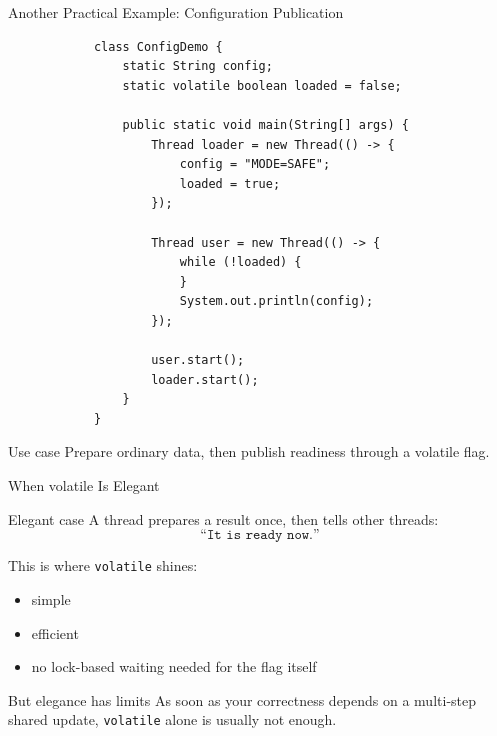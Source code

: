 \documentclass[aspectratio=169,11pt]{beamer}
\begin{document}
	\begin{frame}[fragile]{Another Practical Example: Configuration Publication}
		\begin{lstlisting}
			class ConfigDemo {
				static String config;
				static volatile boolean loaded = false;
				
				public static void main(String[] args) {
					Thread loader = new Thread(() -> {
						config = "MODE=SAFE";
						loaded = true;
					});
					
					Thread user = new Thread(() -> {
						while (!loaded) {
						}
						System.out.println(config);
					});
					
					user.start();
					loader.start();
				}
			}
		\end{lstlisting}
		
		\vspace{0.2cm}
		
		\begin{block}{Use case}
			Prepare ordinary data, then publish readiness through a volatile flag.
		\end{block}
	\end{frame}
	
	\begin{frame}{When volatile Is Elegant}
		\begin{exampleblock}{Elegant case}
			A thread prepares a result once, then tells other threads:
			\[
			\texttt{``It is ready now.''}
			\]
		\end{exampleblock}
		
		\vspace{0.3cm}
		
		This is where \texttt{volatile} shines:
		\begin{itemize}
			\item simple
			\item efficient
			\item no lock-based waiting needed for the flag itself
		\end{itemize}
		
		\vspace{0.3cm}
		
		\begin{alertblock}{But elegance has limits}
			As soon as your correctness depends on a multi-step shared update, \texttt{volatile} alone is usually not enough.
		\end{alertblock}
	\end{frame}
	
\end{document}
